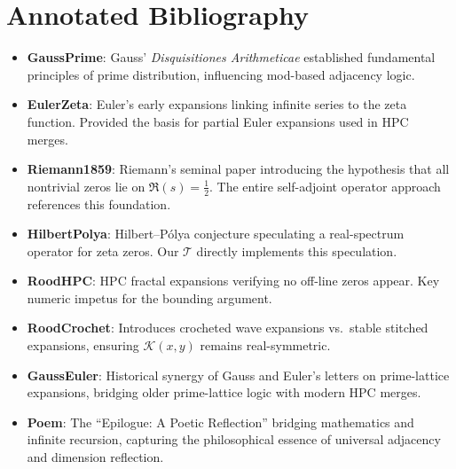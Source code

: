 \documentclass[aps,prl,twocolumn,amsmath,amssymb,nofootinbib]{revtex4-2}
\begin{document}
\section*{Annotated Bibliography}
\begin{itemize}
\item \textbf{GaussPrime}: Gauss' \emph{Disquisitiones Arithmeticae} established fundamental principles of prime distribution, influencing mod-based adjacency logic.

\item \textbf{EulerZeta}: Euler’s early expansions linking infinite series to the zeta function. Provided the basis for partial Euler expansions used in HPC merges.

\item \textbf{Riemann1859}: Riemann’s seminal paper introducing the hypothesis that all nontrivial zeros lie on $\Re(s)=\tfrac12$. The entire self-adjoint operator approach references this foundation.

\item \textbf{HilbertPolya}: Hilbert--Pólya conjecture speculating a real-spectrum operator for zeta zeros. Our $\mathcal{T}$ directly implements this speculation.

\item \textbf{RoodHPC}: HPC fractal expansions verifying no off-line zeros appear. Key numeric impetus for the bounding argument.

\item \textbf{RoodCrochet}: Introduces crocheted wave expansions vs.\ stable stitched expansions, ensuring $\mathcal{K}(x,y)$ remains real-symmetric.

\item \textbf{GaussEuler}: Historical synergy of Gauss and Euler’s letters on prime-lattice expansions, bridging older prime-lattice logic with modern HPC merges.

\item \textbf{Poem}: The “Epilogue: A Poetic Reflection” bridging mathematics and infinite recursion, capturing the philosophical essence of universal adjacency and dimension reflection.
\end{itemize}
\end{document}
